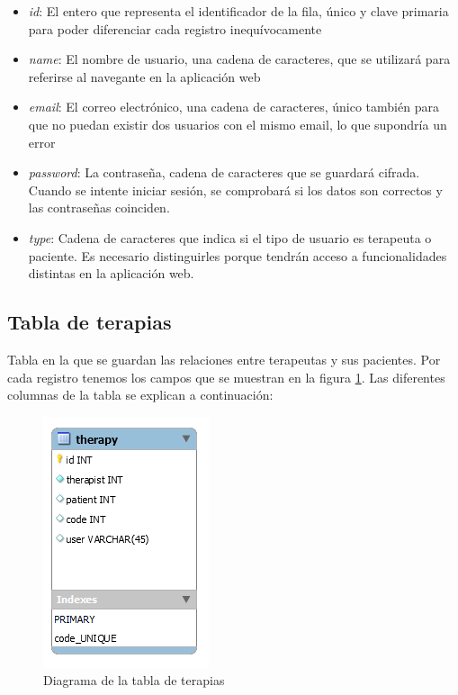 \begin{itemize}
	\item \textit{id}: El entero que representa el identificador de la fila, único y clave primaria para poder diferenciar cada registro inequívocamente
	\item \textit{name}: El nombre de usuario, una cadena de caracteres, que se utilizará para referirse al navegante en la aplicación web
	\item \textit{email}: El correo electrónico, una cadena de caracteres, único también para que no puedan existir dos usuarios con el mismo email, lo que supondría un error
	\item \textit{password}: La contraseña, cadena de caracteres que se guardará cifrada. Cuando se intente iniciar sesión, se comprobará si los datos son correctos y las contraseñas coinciden.
	\item \textit{type}: Cadena de caracteres que indica si el tipo de usuario es terapeuta o paciente. Es necesario distinguirles porque tendrán acceso a funcionalidades distintas en la aplicación web.
\end{itemize}

\subsection{Tabla de terapias}
Tabla en la que se guardan las relaciones entre terapeutas y sus pacientes. Por cada registro tenemos los campos que se muestran en la figura \ref{fig:diagramatablatherapy}. Las diferentes columnas de la tabla se explican a continuación:

\begin{figure}[h]
	\centering
	\includegraphics[scale=1.0]{Imagenes/Vectorial/diagrama_tabla_therapy}
	\caption{Diagrama de la tabla de terapias}
	\label{fig:diagramatablatherapy}
\end{figure}

